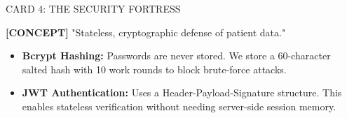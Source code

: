 \documentclass[12pt, a4paper]{article}
\begin{document}
\vspace{0.4cm}

\begin{presentercard}{CARD 4: THE SECURITY FORTRESS}
    \begin{minipage}{0.62\textwidth}
        \textbf{[CONCEPT]} "Stateless, cryptographic defense of patient data."
        \begin{itemize}
            \item \textbf{Bcrypt Hashing:} Passwords are never stored. We store a 60-character salted hash with 10 work rounds to block brute-force attacks.
            \item \textbf{JWT Authentication:} Uses a Header-Payload-Signature structure. This enables stateless verification without needing server-side session memory.
        \end{itemize}
    \end{minipage}
    \begin{minipage}{0.35\textwidth}
        \centering
    \end{minipage}
\end{presentercard}

\vspace{0.4cm}
\end{document}
